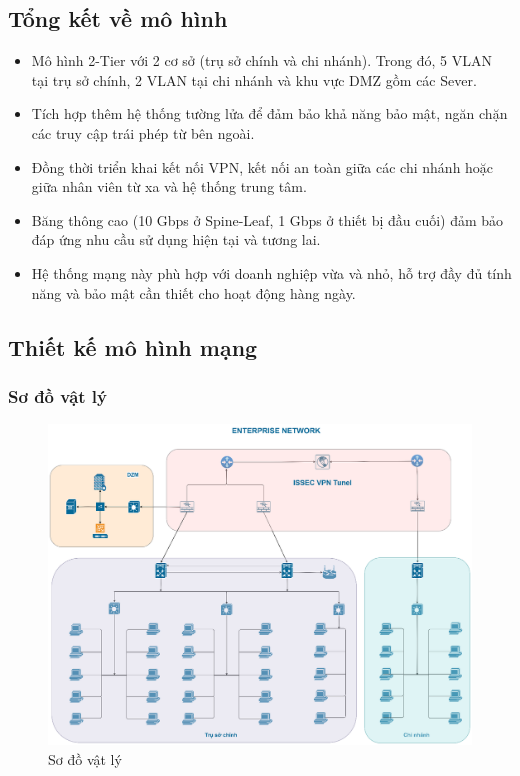 \documentclass[13pt]{article}
\begin{document}
\subsection{Tổng kết về mô hình}
\begin{itemize}
    \item Mô hình 2-Tier với 2 cơ sở (trụ sở chính và chi nhánh). Trong đó, 5 VLAN tại trụ sở chính, 2 VLAN tại chi nhánh và khu vực DMZ gồm các Sever.
    \item Tích hợp thêm hệ thống tường lửa để đảm bảo khả năng bảo mật, ngăn chặn các truy cập trái phép từ bên ngoài. \item Đồng thời triển khai kết nối VPN, kết nối an toàn giữa các chi nhánh hoặc giữa nhân viên từ xa và hệ thống trung tâm.
    \item Băng thông cao (10 Gbps ở Spine-Leaf, 1 Gbps ở thiết bị đầu cuối) đảm bảo đáp ứng nhu cầu sử dụng hiện tại và tương lai.
    \item Hệ thống mạng này phù hợp với doanh nghiệp vừa và nhỏ, hỗ trợ đầy đủ tính năng và bảo mật cần thiết cho hoạt động hàng ngày.
\end{itemize}

\subsection{ Thiết kế mô hình mạng}
\subsubsection{Sơ đồ vật lý}
    \begin{figure}[h!]
        \centering
        \includegraphics[width=1
        \linewidth]{image/24.png}
            \caption{Sơ đồ vật lý}
            \label{fig:label1}
    \end{figure}
\end{document}
